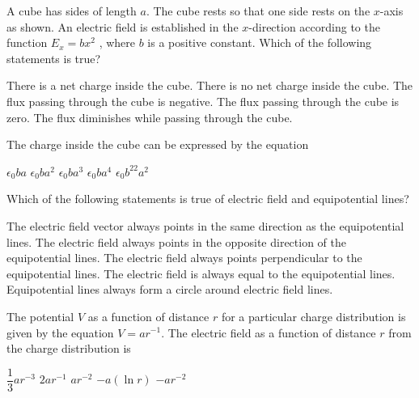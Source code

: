 \documentclass{../../../oss-apphys-exam}
\begin{document}
\begin{multicols*}{2}
\begin{questions}
   \question A cube has sides of length $a$. The cube rests so that one side
   rests on the $x$-axis as shown. An electric field is established in the
   $x$-direction according to the function $E_x=bx^2$ , where $b$ is a positive
   constant. Which of the following statements is true?
   \label{cube1}
   \begin{choices}
     \choice There is a net charge inside the cube.
     \choice There is no net charge inside the cube.
     \choice The flux passing through the cube is negative.
     \choice The flux passing through the cube is zero.
     \choice The flux diminishes while passing through the cube.
   \end{choices}
   \columnbreak
   
   \question The charge inside the cube can be expressed by the equation
   \label{cube2}
   \begin{choices}
     \choice $\epsilon_0ba$
     \choice $\epsilon_0ba^2$
     \choice $\epsilon_0ba^3$
     \choice $\epsilon_0ba^4$
     \choice $\epsilon_0b^22a^2$
   \end{choices}
   
   \question Which of the following statements is true of electric field and
   equipotential lines?
   \begin{choices}
     \choice The electric field vector always points in the same direction as
     the equipotential lines.
     \choice The electric field always points in the opposite direction of the
     equipotential lines.
     \choice The electric field always points perpendicular to the equipotential
     lines.
     \choice The electric field is always equal to the equipotential lines.
     \choice Equipotential lines always form a circle around electric field
     lines.
   \end{choices}
   
   \question The potential $V$ as a function of distance $r$ for a particular
   charge distribution is given by the equation $V=ar^{-1}$. The electric field
   as a function of distance $r$ from the charge distribution is
   \begin{choices}
     \choice $\dfrac13ar^{-3}$
     \choice $2ar^{-1}$
     \choice $ar^{-2}$
     \choice $-a(\ln r)$
     \choice $-ar^{-2}$
   \end{choices}
   \columnbreak
   

\end{questions}
\end{multicols*}
\end{document}
